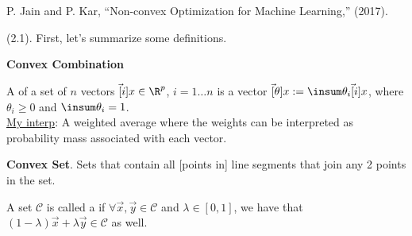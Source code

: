 \documentclass[11pt]{article}
\begin{document}
\label{Optimization}



\vspace{-1em}
{\footnotesize P. Jain and P. Kar, ``Non-convex Optimization for Machine Learning,'' (2017).}

\p {} (2.1). First, let's summarize some definitions.

\textbf{Convex Combination}
\begin{definition}[-1.em]
	A  of a set of $n$ vectors $\vec[i]{x} \in \R^p$, $i=1\ldots n$ is a vector $\vec[\theta]{x} := \insum \theta_i \vec[i]{x}$, where $\theta_i \ge 0$ and $\insum \theta_i = 1$.\\ 
	\underline{My interp}: A weighted average where the weights can be interpreted as probability mass associated with each vector.
\end{definition}

\textbf{Convex Set}. Sets that contain all [points in] line segments that join any 2 points in the set.
\begin{definition}[-2.0em]
	A set $\mathcal C$ is called a  if $\forall \vec x, \vec y \in \mathcal C$ and $\lambda \in [0, 1]$, we have that $(1 - \lambda) \vec x + \lambda \vec y \in \mathcal C$ as well. 
\end{definition}
\end{document}
